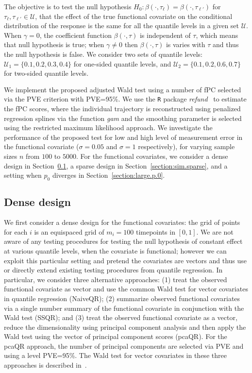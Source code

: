 \documentclass[times,sort&compress,3p]{elsarticle}
\theoremstyle{plain}%
\theoremstyle{definition}
\begin{document}
The objective is to test the null hypothesis $H_0: \beta(\cdot, \tau_{\ell})=\beta(\cdot,\tau_{\ell'})$ for $\tau_{\ell}, \tau_{\ell'}\in \mathcal{U}$, that the effect of the true functional covariate on the conditional distribution of the response is the same for all the quantile levels in a given set $\mathcal{U}$.  
When $\gamma = 0$, the coefficient function
$\beta(\cdot, \tau)$ is independent of $\tau$, which means that null hypothesis is true; when $\gamma\neq 0$ then $\beta(\cdot, \tau)$ is varies with $\tau$ and thus the null hypothesis is false. We consider two sets of quantile levels: $\mathcal{U}_1 =
\{0.1, 0.2, 0.3, 0.4\}$ for one-sided quantile levels, and $\mathcal{U}_2 = \{0.1, 0.2,
0.6, 0.7\}$ for two-sided quantile levels. 

We implement the proposed adjusted Wald test using a number of fPC selected via the PVE criterion with PVE=95\%. We use the {\tt R} package {\it refund}~\citep{refund:15} to estimate the fPC scores, where the individual trajectory is reconstructed using penalized regression splines via the function {\it gam} and the smoothing parameter is selected using the restricted maximum likelihood approach. 
We investigate the performance of the proposed test for low and high level of measurement error in the functional covariate ($\sigma = 0.05$ and $\sigma = 1$ respectively), for varying sample sizes $n$ from $100$ to $5000$. For the functional covariates, we consider a dense design in Section~\ref{section:sim.dense}, a sparse design in Section~\ref{section:sim.sparse}, and a setting when $p_0$ diverges in Section~\ref{section:large.p.0}.



\subsection{Dense design}
\label{section:sim.dense} 

We first consider a dense design for the functional covariates: the grid of points for each $i$ is an equispaced grid of $m_i=100$ timepoints in $[0,1]$. We are not aware of any testing procedures for testing the null hypothesis of constant effect at various quantile levels, when the covariate is functional; however we can exploit this particular setting and pretend the covariates are vectors and thus use or directly extend existing testing procedures from quantile regression. In particular, we consider three alternative approaches: (1) treat the observed functional covariate as vector and use the common Wald test for vector covariates in quantile regression (NaiveQR); (2) summarize observed functional covariates via a single number summary of the functional covariate in conjunction with the Wald test (SSQR); and (3) treat the observed functional covariate as a vector, reduce the dimensionality using principal component analysis and then apply the Wald test using the vector of principal component scores (pcaQR). For the pcaQR approach, the number of principal components are selected via PVE and using a level PVE=95\%. The Wald test for vector covariates in these three approaches is described in~\citep[Chapter 3.2.3]{koenker2005}. 
\end{document}
